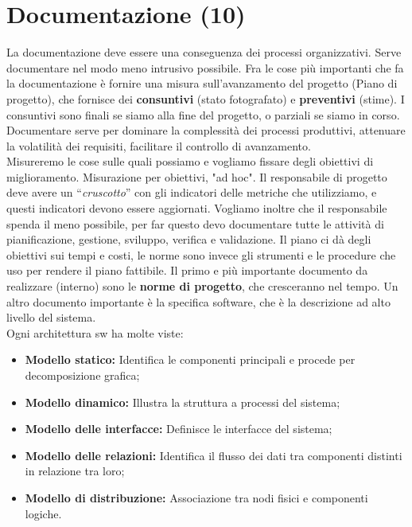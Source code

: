 



\section{Documentazione (10)}

La documentazione deve essere una conseguenza dei processi organizzativi. Serve documentare nel modo meno intrusivo possibile. Fra le cose più importanti che fa la documentazione è fornire una misura sull'avanzamento del progetto (Piano di progetto), che fornisce dei \textbf{consuntivi} (stato fotografato) e \textbf{preventivi} (stime). I consuntivi sono finali se siamo alla fine del progetto, o parziali se siamo in corso.\\
Documentare serve per dominare la complessità dei processi produttivi, attenuare la volatilità dei requisiti, facilitare il controllo di avanzamento.\\

Misureremo le cose sulle quali possiamo e vogliamo fissare degli obiettivi di miglioramento. Misurazione per obiettivi, "ad hoc". Il responsabile di progetto deve avere un ``\textit{cruscotto}'' con gli indicatori delle metriche che utilizziamo, e questi indicatori devono essere aggiornati. Vogliamo inoltre che il responsabile spenda il meno possibile, per far questo devo documentare tutte le attività di pianificazione, gestione, sviluppo, verifica e validazione. Il piano ci dà degli obiettivi sui tempi e costi, le norme sono invece gli strumenti e le procedure che uso per rendere il piano fattibile. Il primo e più importante documento da realizzare (interno) sono le \textbf{norme di progetto}, che cresceranno nel tempo. Un altro documento importante è la specifica software, che è la descrizione ad alto livello del sistema.\\
Ogni architettura sw ha molte viste:

\begin{itemize}

	\item \textbf{Modello statico:} Identifica le componenti principali e procede per decomposizione grafica;
	\item \textbf{Modello dinamico:} Illustra la struttura a processi del sistema;
	\item \textbf{Modello delle interfacce:} Definisce le interfacce  del sistema;
	\item \textbf{Modello delle relazioni:} Identifica il flusso dei dati tra componenti distinti in relazione tra loro;
	\item \textbf{Modello di distribuzione:} Associazione tra nodi fisici e componenti logiche.

\end{itemize}


